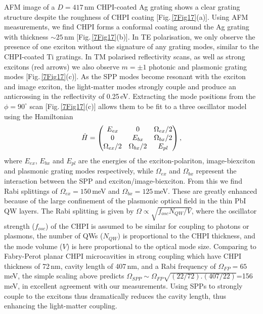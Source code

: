 AFM image of a $D=417$\,nm CHPI-coated Ag grating shows a clear grating structure despite the roughness of CHPI coating [Fig.\,\ref{7Fig17}(a)]. Using AFM measurements, we find CHPI forms a conformal coating around the Ag grating with thickness $\sim25$\,nm [Fig.\,\ref{7Fig17}(b)]. In TE polarisation, we only observe the presence of one exciton without the signature of any grating modes, similar to the CHPI-coated Ti gratings. In TM polarised reflectivity scans, as well as strong %
excitons %
(red arrows) we also observe $m=\pm1$ photonic and plasmonic grating modes [Fig.\,\ref{7Fig17}(c)].  As the SPP modes become resonant with the exciton and image exciton, the light-matter modes strongly couple and produce an anticrossing in the reflectivity of 0.25\,eV. Extracting the mode positions from the $\phi=90^{\circ}$ scan [Fig.\,\ref{7Fig17}(c)] allows them to be fit to a three oscillator model using the Hamiltonian
\begin{equation}
\centering 
\hat{H}=\left( \begin{matrix} 
E_{ex} & 0 & \Omega_{ex}/2 \\
0 & E_{bx} & \Omega_{bx}/2 \\
\Omega_{ex}/2 & \Omega_{bx}/2 & E_{pl} 
\end{matrix} \right) ,
\end{equation}
where $E_{ex}$, $E_{bx}$ and $E_{pl}$ are the energies of the exciton-polariton, image-biexciton and plasmonic grating modes respectively, while $\Omega_{ex}$ and $\Omega_{bx}$ represent the interaction between the SPP and exciton/image-biexciton. From this we find Rabi splittings of $\Omega_{ex}=150$\,meV and $\Omega_{bx}=125$\,meV. 
These are greatly enhanced because of the large confinement of the plasmonic optical field in the thin PbI QW layers. The Rabi splitting is given by $\Omega \propto \sqrt{f_{osc} N_{QW}/V}$, where the oscillator strength ($f_{osc}$) of the CHPI is assumed to be similar for coupling to photons or plasmons, the number of QWs ($N_{QW}$) is proportional to the CHPI thickness, and the mode volume ($V$) is here proportional to the optical mode size. Comparing to Fabry-Perot planar CHPI microcavities in strong coupling \cite{Pradeesh2009b} which have CHPI thickness of 72\,nm, cavity length of 407\,nm, and a Rabi frequency of $\Omega_{FP}=65$\,meV, the simple scaling above predicts $\Omega_{SPP} \sim \Omega_{FP} \sqrt{(22/72).(407/22)}$=156\,meV, in excellent agreement with our measurements. Using SPPs to strongly couple to the excitons thus dramatically reduces the cavity length, thus enhancing the light-matter coupling.
